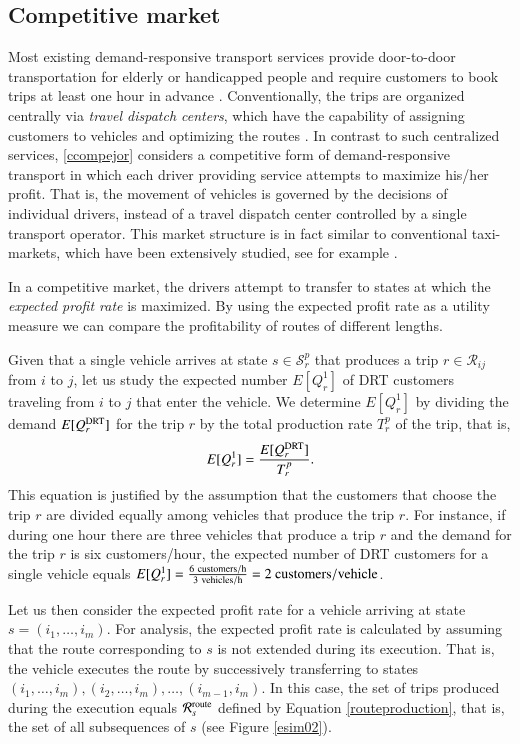 \documentclass[dissertation,draft*]{aaltoseries}
\begin{document}
\subsection{Competitive market}
Most existing demand-responsive transport services provide door-to-door transportation for elderly or handicapped people
and require customers to book trips at least one hour in advance \citep{cordeau05,jouko}.
Conventionally, the trips are organized centrally via \emph{travel dispatch centers}, which have the capability of
assigning customers to vehicles and optimizing the routes \citep{mageean}.
In contrast to such centralized services, \ref{ccompejor} considers a competitive form of demand-responsive transport in which 
each driver providing service attempts to maximize his/her profit. That is,
the movement of vehicles is governed by the decisions of individual drivers, 
instead of a travel dispatch center controlled by a single transport operator.
This market structure is in fact similar to conventional taxi-markets, which have been extensively studied, see for example 
\citep{hackner1995,arnott1996,cairns1996,flores-guri2003,lagos2003,wong2005,matsushima2006,fernandez2006,moore2006,yang2002,yang2005,yang2010}.

In a competitive market, the drivers attempt to transfer to
states at which the \emph{expected profit rate} is maximized. By using the expected profit rate as a 
utility measure we can compare the profitability of routes of different lengths.

Given that a single vehicle arrives at state $s \in \mathcal{S}_{r}^p$ that 
produces a trip $r \in \mathcal{R}_{ij}$ from $i$ to $j$, 
let us study the expected number $E[Q_{r}^1]$ of DRT customers traveling 
from $i$ to $j$ that enter the vehicle.
We determine $E[Q_{r}^1]$ by
dividing the demand $E[Q_{r}^{\rm DRT}]$ for the trip $r$ by the total production rate $T_r^p$ of 
the trip, that is,
\begin{align}
E[Q_{r}^1] = \frac{E[Q_{r}^{\rm DRT}]}{ T_{r}^p}.
\end{align}
This equation is justified by the assumption that the customers
that choose the trip $r$ are divided equally among
vehicles that produce the trip $r$.
For instance, if during one hour there are three vehicles that produce a trip $r$ and the demand
for the trip $r$ is six customers/hour, the expected number of DRT customers
for a single vehicle equals $E[Q_{r}^1] = \frac{6 \ {\rm customers/h}}{3 \ {\rm vehicles/h}} = 2 \ {\rm customers/vehicle}$.

Let us then consider the expected profit rate for a vehicle 
arriving at state $s=(i_1,\ldots,i_m)$. For analysis, the expected profit rate is calculated
by assuming that the 
route corresponding to $s$ is not extended during its execution. 
That is, the vehicle executes the route by successively transferring to 
states $(i_1,\ldots,i_m),(i_2,\ldots,i_m),\ldots,(i_{m-1},i_m)$.
In this case, the    
set of trips produced during the execution equals
$\mathcal{R}_{s}^{\rm route}$ defined by Equation \eqref{routeproduction}, that is, the
set of all subsequences of $s$ (see Figure \ref{esim02}).
\end{document}

